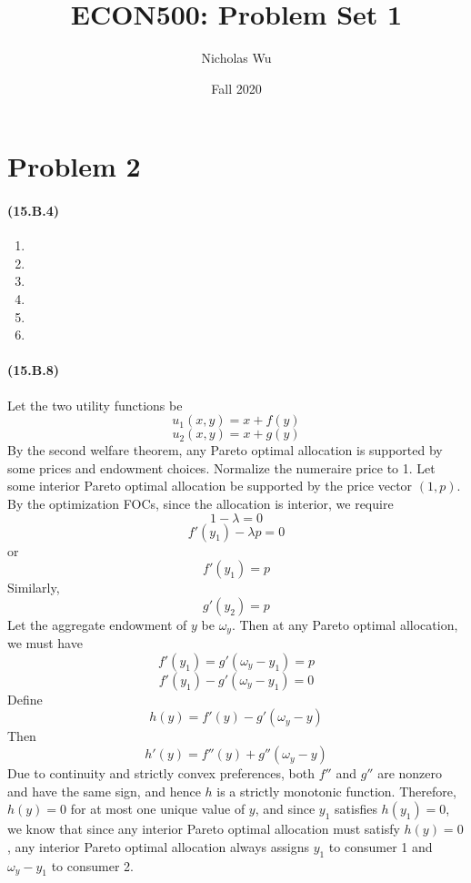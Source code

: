 \documentclass[10pt,letter]{article}
\begin{document}


\title{ECON500: Problem Set 1}

\author{Nicholas Wu}

\date{Fall 2020}

\maketitle


\section*{Problem 2}
\paragraph{(15.B.4)}
\begin{enumerate}[label=(\alph*)]
\item
\item
\item
\item
\item
\item
\end{enumerate}
\paragraph{(15.B.8)} Let the two utility functions be
\[ u_1(x,y) = x + f(y) \]
\[ u_2(x,y) = x + g(y) \]
By the second welfare theorem, any Pareto optimal allocation is supported by some prices and endowment choices. Normalize the numeraire price to 1. Let some interior Pareto optimal allocation be supported by the price vector $(1, p)$. By the optimization FOCs, since the allocation is interior, we require
\[ 1 - \lambda = 0 \]
\[ f'(y_1) - \lambda p =0 \]
or
\[ f'(y_1) = p \]
Similarly,
\[ g'(y_2) = p \]
Let the aggregate endowment of $y$ be $\omega_y$. Then at any Pareto optimal allocation, we must have
\[ f'(y_1) = g'(\omega_y - y_1) = p \]
\[ f'(y_1) - g'(\omega_y - y_1) = 0 \]
Define
\[ h(y) = f'(y) - g'(\omega_y - y) \]
Then
\[ h'(y) = f''(y) + g''(\omega_y - y) \]
Due to continuity and strictly convex preferences, both $f''$ and $g''$ are nonzero and have the same sign, and hence $h$ is a strictly monotonic function. Therefore, $h(y) = 0$ for at most one unique value of $y$, and since $y_1$ satisfies $h(y_1) = 0$, we know that since any interior Pareto optimal allocation must satisfy $h(y) = 0$, any interior Pareto optimal allocation always assigns $y_1$ to consumer 1 and $\omega_y - y_1$ to consumer 2.
\end{document}
